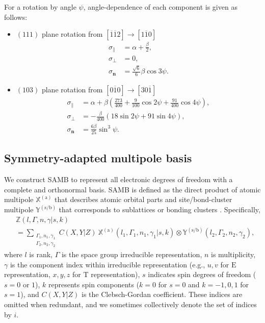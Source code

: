 \documentclass[preprint,12pt]{elsarticle}
\begin{document}
For a rotation by angle $\psi$, angle-dependence of each component is
given as follows:
\begin{itemize}
  \item $(111)$ plane rotation from $[\overline{1}\overline{1}2] \to
    [1\overline{1}0]$
    \begin{align}
      \sigma_\parallel & = \alpha + \frac{\beta}{2},
      \label{eq:sigma_parallel_111}\\
      \sigma_\perp     & = 0,
      \label{eq:sigma_perp_111}\\
      \sigma_{\bm{n}}  & = \frac{\sqrt{6}}{6}\beta\cos3\psi.
      \label{eq:sigma_n_111}
    \end{align}
  \item $(103)$ plane rotation from $[0\overline{1}0] \to [30\overline{1}]$
    \begin{align}
      \sigma_\parallel & = \alpha + \beta\left(\frac{273}{400} +
      \frac{9}{100}\cos2\psi + \frac{91}{400}\cos4\psi\right),
      \label{eq:sigma_parallel_103}\\
      \sigma_\perp     & = -\frac{\beta}{400}\left(18\sin2\psi +
      91\sin4\psi\right),
      \label{eq:sigma_perp_103}\\
      \sigma_{\bm{n}}  & = \frac{6\beta}{25}\sin^3\psi.
      \label{eq:sigma_n_103}
    \end{align}
\end{itemize}

\subsection{Symmetry-adapted multipole basis}
\label{sec:samb}

We construct SAMB to represent all electronic degrees of freedom with
a complete and orthonormal basis.
SAMB is defined as the direct product of atomic multipole
$\mathbb{X}^{(\mathrm{a})}$ that describes atomic orbital parts and
site/bond-cluster multipole $\mathbb{Y}^{(\mathrm{s/b})}$ that
corresponds to sublattices or bonding clusters \cite{Kusunose2020-oa,
Kusunose2023-fe}.
Specifically,
\begin{align}
  &\mathbb{Z}(l, \Gamma, n, \gamma | s, k) \nonumber\\
  & = \sum_{\substack{\Gamma_1, n_1, \gamma_1 \\
  \Gamma_2, n_2, \gamma_2}}
  C(X,Y |Z)
  ~\mathbb{X}^{(\mathrm{a})}(l_1, \Gamma_1, n_1, \gamma_1 | s, k)
  \otimes \mathbb{Y}^{(\mathrm{s/b})}(l_2, \Gamma_2, n_2, \gamma_2),
\end{align}
where $l$ is rank, $\Gamma$ is the space group irreducible
representation, $n$ is multiplicity,
$\gamma$ is the component index within irreducible representation
(e.g., $u,v$ for $\mathrm{E}$ representation, $x,y,z$ for
$\mathrm{T}$ representation),
$s$ indicates spin degrees of freedom ($s=0$ or $1$), $k$ represents
spin components ($k=0$ for $s=0$ and $k=-1,0,1$ for $s=1$),
and $C(X,Y | Z)$ is the Clebsch-Gordan coefficient.
These indices are omitted when
redundant, and we sometimes collectively denote the set of indices by $i$.
\end{document}
